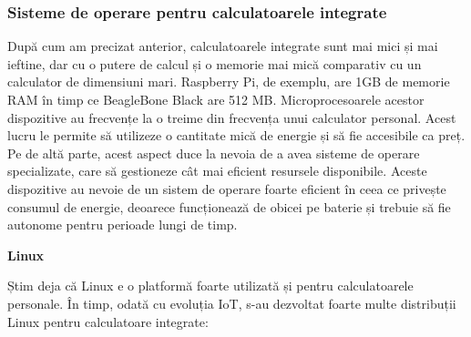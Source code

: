 \subsubsection{Sisteme de operare pentru calculatoarele integrate}
\label{sec:embed:micro-comp:embed:os}

După cum am precizat anterior, calculatoarele integrate sunt mai mici și mai
ieftine, dar cu o putere de calcul și o memorie mai mică comparativ cu un
calculator de dimensiuni mari. Raspberry Pi, de exemplu, are 1GB de memorie RAM
în timp ce BeagleBone Black are 512 MB. Microprocesoarele acestor dispozitive au
frecvențe la o treime din frecvența unui calculator personal. Acest lucru le
permite să utilizeze o cantitate mică de energie și să fie accesibile ca preț.
Pe de altă parte, acest aspect duce la nevoia de a avea sisteme de operare
specializate, care să gestioneze cât mai eficient resursele disponibile. Aceste
dispozitive au nevoie de un sistem de operare foarte eficient în ceea ce
privește consumul de energie, deoarece funcționează de obicei pe baterie
și trebuie să fie autonome pentru perioade lungi de timp.

\textbf{Linux}

Știm deja că Linux e o platformă foarte utilizată și pentru calculatoarele
personale. În timp, odată cu evoluția IoT, s-au dezvoltat foarte multe
distribuții Linux pentru calculatoare integrate:

